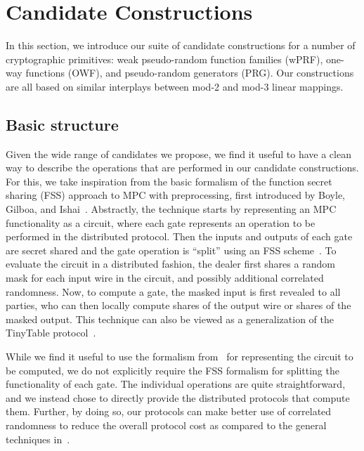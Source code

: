 
\newpage

\section{Candidate Constructions}
\label{sec:candidates}
In this section, we introduce our suite of candidate constructions for a number of cryptographic primitives: weak pseudo-random function families (wPRF), one-way functions (OWF), and pseudo-random generators (PRG). Our constructions are all based on similar interplays between mod-2 and mod-3 linear mappings. 

\subsection{Basic structure}
Given the wide range of candidates we propose, we find it useful to have a clean way to describe the operations that are performed in our candidate constructions. For this, we take inspiration from the basic formalism of the function secret sharing (FSS) approach to MPC with preprocessing, first introduced by Boyle, Gilboa, and Ishai~\cite{boyle2019-fss-preprocess}. Abstractly, the technique starts by representing an MPC functionality as a circuit, where each gate represents an operation to be performed in the distributed protocol. Then the inputs and outputs of each gate are secret shared and the gate operation is ``split'' using an FSS scheme~\cite{boyle2015-fss,boyle2016-fss-extension}. To evaluate the circuit in a distributed fashion, the dealer first shares a random mask for each input wire in the circuit, and possibly additional correlated randomness. Now, to compute a gate, the masked input is first revealed to all parties, who can then locally compute shares of the output wire or shares of the masked output. This technique can also be viewed as a generalization of the TinyTable protocol~\cite{damgard2017-tinytable}.

While we find it useful to use the formalism from~\cite{boyle2019-fss-preprocess} for representing the circuit to be computed, we do not explicitly require the FSS formalism for splitting the functionality of each gate. The individual operations are quite straightforward, and we instead chose to directly provide the distributed protocols that compute them. Further, by doing so, our protocols can make better use of correlated randomness to reduce the overall protocol cost as compared to the general techniques in~\cite{boyle2019-fss-preprocess}.


